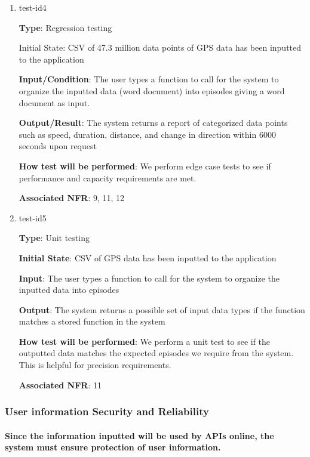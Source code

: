 \documentclass[12pt, titlepage]{article}
\begin{document}
\begin{enumerate}

\item{test-id4\\}

\textbf{Type}: Regression testing
					
Initial State: CSV of 47.3 million data points of GPS data has been inputted to the application
					
\textbf{Input/Condition}: The user types a function to call for the system to organize the
inputted data (word document) into episodes giving a word document as input. 
					
\textbf{Output/Result}: The system returns a report of categorized data points such
as speed, duration, distance, and change in direction within 6000 seconds upon request
					
\textbf{How test will be performed}: We perform edge case tests to see if performance and capacity requirements are met. 

\textbf{Associated NFR}: 9, 11, 12

\item{test-id5\\}

\textbf{Type}: Unit testing
					
\textbf{Initial State}: CSV of GPS data has been inputted to the application
					
\textbf{Input}: The user types a function to call for the system to organize the
inputted data into episodes
					
\textbf{Output}: The system returns a possible set of input data types if the function matches a stored function in the system
					
\textbf{How test will be performed}: We perform a unit test to see if the outputted data matches the expected episodes we require from the system. This is helpful for precision requirements.

\textbf{Associated NFR}: 11

\end{enumerate}


\subsubsection{User information Security and Reliability}
		
\paragraph{Since the information inputted will be used by APIs online, the system must ensure protection of user information.}
\end{document}

